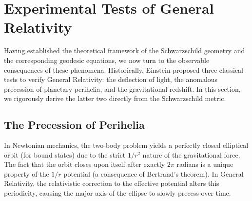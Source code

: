\documentclass[11pt, a4paper]{report}
\begin{document}
\section{Experimental Tests of General Relativity}

Having established the theoretical framework of the Schwarzschild geometry and the corresponding geodesic equations, we now turn to the observable consequences of these phenomena. Historically, Einstein proposed three classical tests to verify General Relativity: the deflection of light, the anomalous precession of planetary perihelia, and the gravitational redshift. In this section, we rigorously derive the latter two directly from the Schwarzschild metric.

\subsection{The Precession of Perihelia}

In Newtonian mechanics, the two-body problem yields a perfectly closed elliptical orbit (for bound states) due to the strict $1/r^2$ nature of the gravitational force. The fact that the orbit closes upon itself after exactly $2\pi$ radians is a unique property of the $1/r$ potential (a consequence of Bertrand's theorem). In General Relativity, the relativistic correction to the effective potential alters this periodicity, causing the major axis of the ellipse to slowly precess over time. 
\end{document}
